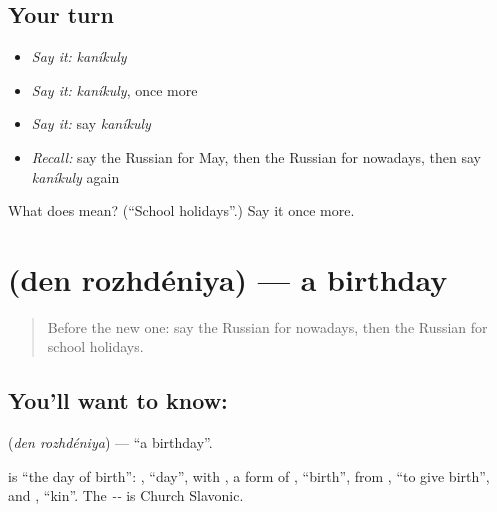 \subsection*{Your turn}
\begin{itemize}
\raggedright
  \item \emph{Say it:} \emph{kaníkuly}
  \item \emph{Say it:} \emph{kaníkuly}, once more
  \item \emph{Say it:} say \emph{kaníkuly}
  \item \emph{Recall:} say the Russian for May, then the Russian for nowadays, then say \emph{kaníkuly} again
\end{itemize}

\begin{tcolorbox}[breakable,colback=teal!4,colframe=teal!35!black,title={Before you move on}]
What does  mean? (\textquotedblleft{}School holidays\textquotedblright{}.) Say it once more.
\end{tcolorbox}
\section[\texorpdfstring{\ru{день} \ru{рождения} (den rozhdéniya)}{день рождения (den rozhdéniya)}]{  (den rozhdéniya) — a birthday}

\label{lesson:RU-C182-den-rozhdeniya}



\begin{quote}
Before the new one: say the Russian for nowadays, then the Russian for school holidays.
\end{quote}

\subsection*{You'll want to know:  }
\textbf{ } (\emph{den rozhdéniya}) — \textquotedblleft{}a birthday\textquotedblright{}.

\begin{cousinweb}
\textbf{ } is \textquotedblleft{}the day of birth\textquotedblright{}: \emph{}, \textquotedblleft{}day\textquotedblright{}, with \emph{}, a form of \emph{}, \textquotedblleft{}birth\textquotedblright{}, from \emph{}, \textquotedblleft{}to give birth\textquotedblright{}, and \emph{}, \textquotedblleft{}kin\textquotedblright{}. The \emph{--} is Church Slavonic.
\end{cousinweb}

